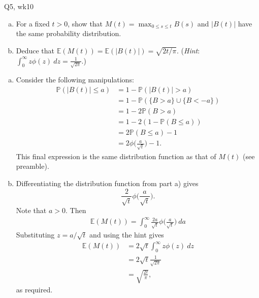 \begin{problem}{Q5, wk10}{}


    \begin{enumerate}[a)]
        \item For a fixed $t > 0$, show that $M(t) = \max_{0 \leq s \leq t} B(s)$ and $\lvert B(t) \rvert$ have the same probability distribution.
        \item Deduce that $\mathbb{E}(M(t)) = \mathbb{E}(\lvert B(t) \rvert) = \sqrt{2 t / \pi}$. (\textit{Hint}: $\int_0^\infty z \phi(z) \ dz = \frac{1}{\sqrt{2 \pi}}$.)
    \end{enumerate}

    \tcblower

    \begin{enumerate}[a)]
        \item Consider the following manipulations:
                \begin{align*}
                    \mathbb{P}(\lvert B(t) \rvert \leq a) &= 1 - \mathbb{P}(\vert B(t) \rvert > a) \\
                    &= 1 - \mathbb{P}(\{B > a\} \cup \{B < -a\}) \\
                    &= 1 - 2\mathbb{P}(B > a) \\
                    &= 1 - 2(1 - \mathbb{P}(B \leq a)) \\
                    &= 2 \mathbb{P}(B \leq a) - 1 \\
                    &= 2 \phi \biggl( \frac{a}{\sqrt{t}} \biggr) - 1 .
                \end{align*}
            This final expression is the same distribution function as that of $M(t)$ (see preamble).
        \item Differentiating the distribution function from part a) gives
            $$ \frac{2}{\sqrt{t}} \phi \biggl( \frac{a}{\sqrt{t}} \biggr) . $$
            Note that $a > 0$. Then
                \begin{align*}
                    \mathbb{E}(M(t)) = \int_0^\infty \frac{2 a}{\sqrt{t}} \phi \biggl( \frac{a}{\sqrt{t}} \biggr) \ da
                \end{align*}
            Substituting $z = a / \sqrt{t}$ and using the hint gives
                \begin{align*}
                    \mathbb{E}(M(t)) &= 2 \sqrt{t} \int_0^\infty z \phi (z) \ dz \\
                    &= 2 \sqrt{t} \frac{1}{\sqrt{2 \pi}} \\
                    &= \sqrt{\frac{2t}{\pi}} ,
                \end{align*}
            as required.
    \end{enumerate}

\end{problem}



